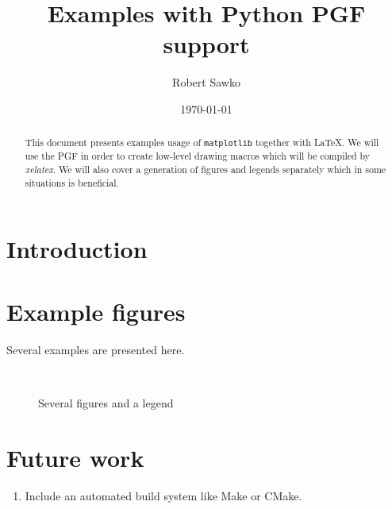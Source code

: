 \documentclass{article}
\date{\today}
\author{Robert Sawko}
\affil{Department of Engineering Computing, Cranfield University}
\title{Examples with Python PGF support}
\begin{document}
\maketitle

\begin{abstract}

  This document presents examples usage of \texttt{matplotlib} together with
  \LaTeX. We will use the PGF in order to create low-level drawing macros which
  will be compiled by \textit{xelatex}. We will also cover a generation of
  figures and legends separately which in some situations is beneficial. 
\end{abstract}

\section{Introduction}

\section{Example figures}

Several examples are presented here.

\begin{figure}[b] 
  \centering
   
   
   
  \\
   
  \caption{Several figures and a legend}
  \label{fig:problem} 
\end{figure}

\section{Future work}
\begin{enumerate}
  \item Include an automated build system like Make or CMake.
\end{enumerate}
\end{document}
